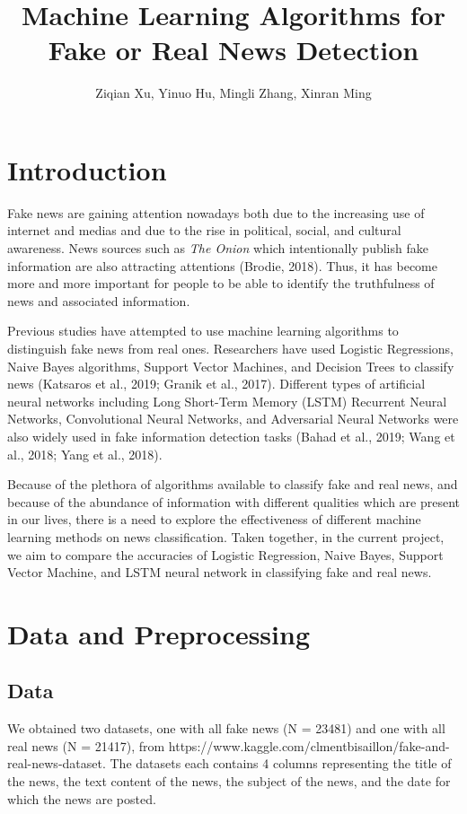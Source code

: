 \documentclass{article}
\title{Machine Learning Algorithms for Fake or Real News Detection}
\author{Ziqian Xu, Yinuo Hu, Mingli Zhang, Xinran Ming}
\date{}
\begin{document}
\maketitle


\begin{multicols}{2}
\section{Introduction}

Fake news are gaining attention nowadays both due to the increasing use of internet and medias and due to the rise in political, social, and cultural awareness. News sources such as \emph{The Onion} which intentionally publish fake information are also attracting attentions (Brodie, 2018). Thus, it has become more and more important for people to be able to identify the truthfulness of news and associated information.\par

Previous studies have attempted to use machine learning algorithms to distinguish fake news from real ones. Researchers have used Logistic Regressions, Naive Bayes algorithms, Support Vector Machines, and Decision Trees to classify news (Katsaros et al., 2019; Granik et al., 2017). Different types of artificial neural networks including Long Short-Term Memory (LSTM) Recurrent Neural Networks, Convolutional Neural Networks, and Adversarial Neural Networks were also widely used in fake information detection tasks (Bahad et al., 2019; Wang et al., 2018; Yang et al., 2018). \par

Because of the plethora of algorithms available to classify fake and real news, and because of the abundance of information with different qualities which are present in our lives, there is a need to explore the effectiveness of different machine learning methods on news classification. Taken together, in the current project, we aim to compare the accuracies of Logistic Regression, Naive Bayes, Support Vector Machine, and LSTM neural network in classifying fake and real news. 


\section{Data and Preprocessing}

\subsection{Data}
We obtained two datasets, one with all fake news (N = 23481) and one with all real news (N = 21417), from https://www.kaggle.com/clmentbisaillon/fake-and-real-news-dataset. The datasets each contains 4 columns representing the title of the news, the text content of the news, the subject of the news, and the date for which the news are posted. 


\end{multicols}
\end{document}
